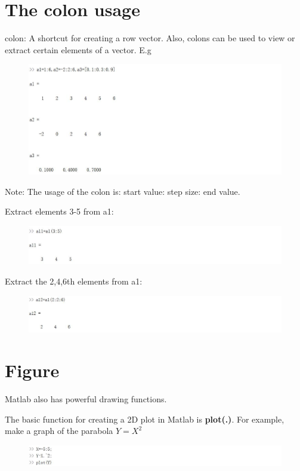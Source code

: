 \documentclass[10pt,math=newtx,citestyle=gb7714-2015,bibstyle=gb7714-2015]{elegantbook}
\begin{document}
{{{	\section{The colon usage}
	
	colon: A shortcut for creating a row vector. Also, colons can be used to view or extract certain elements of a vector. E.g
	\begin{figure}[htbp!]
		\centering
		\includegraphics[width=0.8\linewidth]{FIG/colon.jpg}
		\centering
	\end{figure}
	
	Note: The usage of the colon is: start value: step size: end value.
	
	Extract elements 3-5 from a1:
	\begin{figure}[htbp!]
		\centering
		\includegraphics[width=0.8\linewidth]{FIG/extracting1.jpg}
		\centering
	\end{figure}
	
	Extract the 2,4,6th elements from a1:
	\begin{figure}[htbp!]
		\centering
		\includegraphics[width=0.8\linewidth]{FIG/extracting2.jpg}
		\centering
	\end{figure}
	
	\section{Figure}
	
	Matlab also has powerful drawing functions.
	
	The basic function for creating a 2D plot in Matlab is \textbf{plot(.)}. For example, make a graph of the parabola $Y=X^2$
	\begin{figure}[htbp!]
		\centering
		\includegraphics[width=0.8\linewidth]{FIG/Yplot.jpg}
		\centering
	\end{figure}
	
}}}
\end{document}
